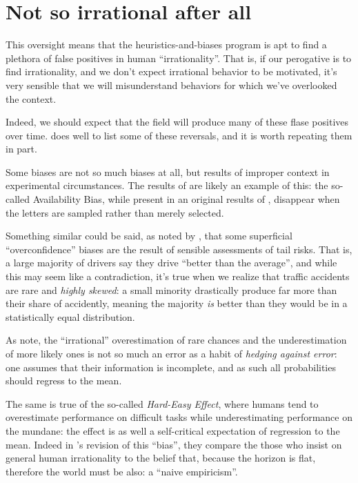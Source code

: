 \documentclass{article}
\begin{document}
\section{Not so irrational after all}

This oversight means that the heuristics-and-biases program is apt to find a plethora of false positives in human ``irrationality''.
That is, if our perogative is to find irrationality, and we don't expect irrational behavior to be motivated, it's very sensible that we will misunderstand behaviors for which we've overlooked the context.

Indeed, we should expect that the field will produce many of these flase positives over time. \textcite[14--15]{gigerenzer08} does well to list some of these reversals,  and it is worth repeating them in part.



Some biases are not so much biases at all, but results of improper context in experimental circumstances.
The results of \textcite{sedlmeier98} are likely an example of this: the so-called Availability Bias, while present in an original results of \textcite{tversky73}, disappear when the letters are sampled rather than merely selected.

Something similar could be said, as noted by \textcite{lopes92}, that some superficial ``overconfidence'' biases are the result of sensible assessments of tail risks.
That is, a large majority of drivers say they drive ``better than the average'', and while this may seem like a contradiction, it's true when we realize that traffic accidents are rare and \emph{highly skewed}: a small minority drastically produce far more than their share of accidently, meaning the majority \emph{is} better than they would be in a statistically equal distribution.

As \textcite{hertig05} note, the ``irrational'' overestimation of rare chances and the underestimation of more likely ones is not so much an error as a habit of \emph{hedging against error}: one assumes that their information is incomplete, and as such all probabilities should regress to the mean.

The same is true of the so-called \textit{Hard-Easy Effect}, where humans tend to overestimate performance on difficult tasks while underestimating performance on the mundane: the effect is as well a self-critical expectation of regression to the mean.
Indeed in \textcite{juslin00}'s revision of this ``bias'', they compare the those who insist on general human irrationality to the belief that, because the horizon is flat, therefore the world must be also: a ``naive empiricism''.
\end{document}
